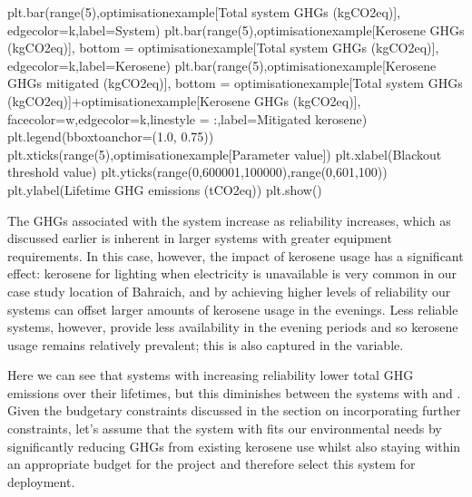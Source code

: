 \documentclass[letterpaper,10pt,english]{sphinxmanual}
\begin{document}
\begin{sphinxVerbatim}[commandchars=\\\{\}]
plt.bar(range(5),optimisation\PYGZus{}example[\PYGZsq{}Total system GHGs (kgCO2eq)\PYGZsq{}],
       edgecolor=\PYGZsq{}k\PYGZsq{},label=\PYGZsq{}System\PYGZsq{})
plt.bar(range(5),optimisation\PYGZus{}example[\PYGZsq{}Kerosene GHGs (kgCO2eq)\PYGZsq{}],
        bottom = optimisation\PYGZus{}example[\PYGZsq{}Total system GHGs (kgCO2eq)\PYGZsq{}],
       edgecolor=\PYGZsq{}k\PYGZsq{},label=\PYGZsq{}Kerosene\PYGZsq{})
plt.bar(range(5),optimisation\PYGZus{}example[\PYGZsq{}Kerosene GHGs mitigated (kgCO2eq)\PYGZsq{}],
        bottom = optimisation\PYGZus{}example[\PYGZsq{}Total system GHGs (kgCO2eq)\PYGZsq{}]+optimisation\PYGZus{}example[\PYGZsq{}Kerosene GHGs (kgCO2eq)\PYGZsq{}],
        facecolor=\PYGZsq{}w\PYGZsq{},edgecolor=\PYGZsq{}k\PYGZsq{},linestyle = \PYGZsq{}:\PYGZsq{},label=\PYGZsq{}Mitigated kerosene\PYGZsq{})
plt.legend(bbox\PYGZus{}to\PYGZus{}anchor=(1.0, 0.75))
plt.xticks(range(5),optimisation\PYGZus{}example[\PYGZsq{}Parameter value\PYGZsq{}])
plt.xlabel(\PYGZsq{}Blackout threshold value\PYGZsq{})
plt.yticks(range(0,600001,100000),range(0,601,100))
plt.ylabel(\PYGZsq{}Lifetime GHG emissions (tCO2eq)\PYGZsq{})
plt.show()
\end{sphinxVerbatim}

\noindent{}

\sphinxAtStartPar
The GHGs associated with the system increase as reliability increases,
which as discussed earlier is inherent in larger systems with greater
equipment requirements. In this case, however, the impact of kerosene
usage has a significant effect: kerosene for lighting when electricity
is unavailable is very common in our case study location of Bahraich,
and by achieving higher levels of reliability our systems can offset
larger amounts of kerosene usage in the evenings. Less reliable systems,
however, provide less availability in the evening periods and so
kerosene usage remains relatively prevalent; this is also captured in
the  variable.

\sphinxAtStartPar
Here we can see that systems with increasing reliability lower total GHG
emissions over their lifetimes, but this diminishes between the systems
with  and . Given the budgetary
constraints discussed in  the section on incorporating further constraints,
let’s assume that the system with  fits our
environmental needs by significantly reducing GHGs from existing
kerosene use whilst also staying within an appropriate budget for the
project and therefore select this system for deployment.
\end{document}
